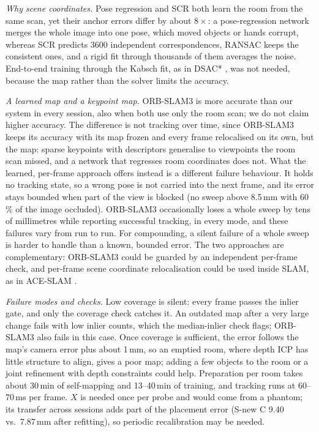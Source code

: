 \documentclass[9pt,shortpaper,twoside,web]{ieeecolor2}
\newcommand{\Snew}{S-new}
\begin{document}
\emph{Why scene coordinates.} Pose regression and SCR both learn the room from the same scan, yet their anchor errors differ by about $8\times$: a pose-regression network merges the whole image into one pose, which moved objects or hands corrupt, whereas SCR predicts 3600 independent correspondences, RANSAC keeps the consistent ones, and a rigid fit through thousands of them averages the noise. End-to-end training through the Kabsch fit, as in DSAC* \cite{brachmann2022dsac}, was not needed, because the map rather than the solver limits the accuracy.

\emph{A learned map and a keypoint map.} ORB-SLAM3 is more accurate than our system in every session, also when both use only the room scan; we do not claim higher accuracy. The difference is not tracking over time, since ORB-SLAM3 keeps its accuracy with its map frozen and every frame relocalised on its own, but the map: sparse keypoints with descriptors generalise to viewpoints the room scan missed, and a network that regresses room coordinates does not. What the learned, per-frame approach offers instead is a different failure behaviour. It holds no tracking state, so a wrong pose is not carried into the next frame, and its error stays bounded when part of the view is blocked (no sweep above 8.5\,mm with 60\,\% of the image occluded). ORB-SLAM3 occasionally loses a whole sweep by tens of millimetres while reporting successful tracking, in every mode, and these failures vary from run to run. For compounding, a silent failure of a whole sweep is harder to handle than a known, bounded error. The two approaches are complementary: ORB-SLAM3 could be guarded by an independent per-frame check, and per-frame scene coordinate relocalisation could be used inside SLAM, as in ACE-SLAM \cite{alzugaray2025aceslam}.

\emph{Failure modes and checks.} Low coverage is silent: every frame passes the inlier gate, and only the coverage check catches it. An outdated map after a very large change fails with low inlier counts, which the median-inlier check flags; ORB-SLAM3 also fails in this case. Once coverage is sufficient, the error follows the map's camera error plus about 1\,mm, so an emptied room, where depth ICP has little structure to align, gives a poor map; adding a few objects to the room or a joint refinement with depth constraints could help. Preparation per room takes about 30\,min of self-mapping and 13--40\,min of training, and tracking runs at 60--70\,ms per frame. $X$ is needed once per probe and would come from a phantom; its transfer across sessions adds part of the placement error (\Snew{} C 9.40 vs.\ 7.87\,mm after refitting), so periodic recalibration may be needed.
\end{document}

